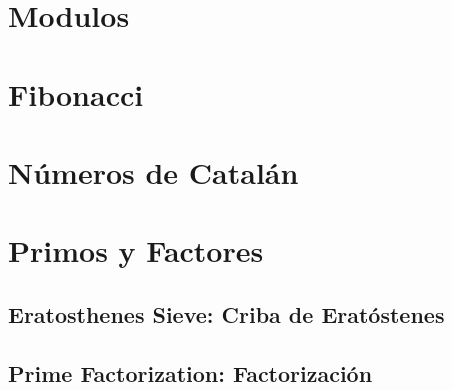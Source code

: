 \documentclass[12pt, fleqn]{report}                             %
\theoremstyle{break}                                            %
\begin{document}
        \section{Modulos}

        \section{Fibonacci}

        \section{Números de Catalán}

        \section{Primos y Factores}

            \subsection{Eratosthenes Sieve: Criba de Eratóstenes}

            \subsection{Prime Factorization: Factorización}

\end{document}
